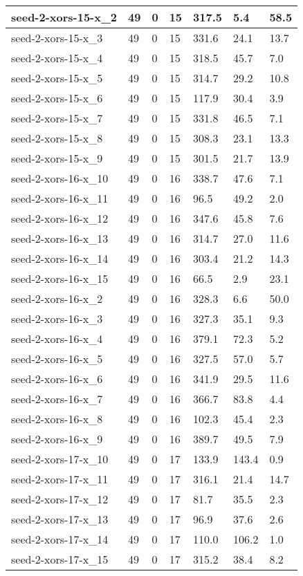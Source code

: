 \begin{scriptsize}
\begin{longtable}{|p{5cm}|l|l|l|l|l|l|}
seed-2-xors-15-x\_2&49&0&15&317.5&5.4&58.5 \\ \hline 
seed-2-xors-15-x\_3&49&0&15&331.6&24.1&13.7 \\ \hline 
seed-2-xors-15-x\_4&49&0&15&318.5&45.7&7.0 \\ \hline 
seed-2-xors-15-x\_5&49&0&15&314.7&29.2&10.8 \\ \hline 
seed-2-xors-15-x\_6&49&0&15&117.9&30.4&3.9 \\ \hline 
seed-2-xors-15-x\_7&49&0&15&331.8&46.5&7.1 \\ \hline 
seed-2-xors-15-x\_8&49&0&15&308.3&23.1&13.3 \\ \hline 
seed-2-xors-15-x\_9&49&0&15&301.5&21.7&13.9 \\ \hline 
seed-2-xors-16-x\_10&49&0&16&338.7&47.6&7.1 \\ \hline 
seed-2-xors-16-x\_11&49&0&16&96.5&49.2&2.0 \\ \hline 
seed-2-xors-16-x\_12&49&0&16&347.6&45.8&7.6 \\ \hline 
seed-2-xors-16-x\_13&49&0&16&314.7&27.0&11.6 \\ \hline 
seed-2-xors-16-x\_14&49&0&16&303.4&21.2&14.3 \\ \hline 
seed-2-xors-16-x\_15&49&0&16&66.5&2.9&23.1 \\ \hline 
seed-2-xors-16-x\_2&49&0&16&328.3&6.6&50.0 \\ \hline 
seed-2-xors-16-x\_3&49&0&16&327.3&35.1&9.3 \\ \hline 
seed-2-xors-16-x\_4&49&0&16&379.1&72.3&5.2 \\ \hline 
seed-2-xors-16-x\_5&49&0&16&327.5&57.0&5.7 \\ \hline 
seed-2-xors-16-x\_6&49&0&16&341.9&29.5&11.6 \\ \hline 
seed-2-xors-16-x\_7&49&0&16&366.7&83.8&4.4 \\ \hline 
seed-2-xors-16-x\_8&49&0&16&102.3&45.4&2.3 \\ \hline 
seed-2-xors-16-x\_9&49&0&16&389.7&49.5&7.9 \\ \hline 
seed-2-xors-17-x\_10&49&0&17&133.9&143.4&0.9 \\ \hline 
seed-2-xors-17-x\_11&49&0&17&316.1&21.4&14.7 \\ \hline 
seed-2-xors-17-x\_12&49&0&17&81.7&35.5&2.3 \\ \hline 
seed-2-xors-17-x\_13&49&0&17&96.9&37.6&2.6 \\ \hline 
seed-2-xors-17-x\_14&49&0&17&110.0&106.2&1.0 \\ \hline 
seed-2-xors-17-x\_15&49&0&17&315.2&38.4&8.2 \\ \hline 

\end{longtable}
\end{scriptsize}
